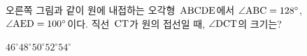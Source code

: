 \noindent\begin{minipage}[t]{0.58\linewidth}\vspace{0pt}\raggedright 오른쪽 그림과 같이 원에 내접하는 오각형~$\mathrm{ABCDE}$에서 $\angle\mathrm{ABC}=128^\circ$, $\angle\mathrm{AED}=100^\circ$이다. 직선~$\mathrm{CT}$가 원의 접선일 때, $\angle\mathrm{DCT}$의 크기는?\end{minipage}\hfill\begin{minipage}[t]{0.4\linewidth}\vspace{0pt}\centering \resizebox{\ifdim\width>\linewidth\linewidth\else\width\fi}{!}{}\end{minipage}\par
\begin{choices32}{$46^\circ$}{$48^\circ$}{$50^\circ$}{$52^\circ$}{$54^\circ$}\end{choices32}
